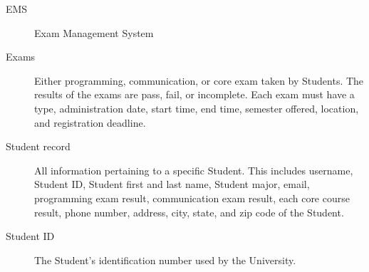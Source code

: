 
\begin{description}
   \item[EMS] Exam Management System 
   \item[Exams]  Either programming, communication, or core exam taken by Students.
      The results of the exams are pass, fail, or incomplete. Each exam must
      have a type, administration date, start time, end time, semester offered,
      location, and registration deadline.
   \item[Student record]  All information pertaining to a specific Student. This
      includes username, Student ID, Student first and last name, Student major,
      email, programming exam result, communication exam result, each core
      course result, phone number, address, city, state, and zip code of the
      Student.
   \item[Student ID] The Student's identification number used by the University.
\end{description}
